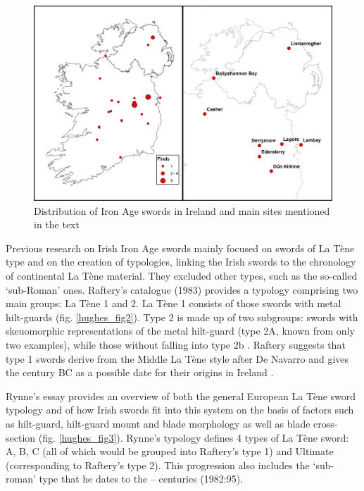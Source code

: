 \begin{figure}
\includegraphics[width=\linewidth]{figures/Hughes_Sword_fig01.jpg} 
\caption{Distribution of Iron Age swords in Ireland and main sites mentioned in the text}
\label{hughes_fig1}
\end{figure}
Previous research on Irish Iron Age swords \parencites{Rynne1982}{Raftery1983} mainly focused on swords of La Tène type and on the creation of typologies, linking the Irish swords to the chronology of continental La Tène material. 
They excluded other types, such as the so-called ‘sub-Roman’ ones. 
Raftery’s catalogue (1983) provides a typology comprising two main groups: 
La Tène 1 and 2. La Tène 1 consists of those swords with metal hilt-guards (fig. \ref{hughes_fig2}). 
Type 2 is made up of two subgroups: 
swords with skeuomorphic representations of the metal hilt-guard (type 2A, known from only two examples), while those without falling into type 2b 
\parencite[83--106]{Raftery1983}. 
Raftery suggests that type 1 swords derive from the Middle La Tène style after De Navarro and gives the  century BC as a possible date for their origins in Ireland 
\parencites{DeNavarro1972}[83]{Raftery1983}. 

Rynne’s \citeyear{Rynne1982} essay provides an overview of both the general European La Tène sword typology and of how Irish swords fit into this system on the basis of factors such as hilt-guard, hilt-guard mount and blade morphology as well as blade cross-section (fig. \ref{hughes_fig3}). 
Rynne’s typology defines 4 types of La Tène sword: A, B, C (all of which would be grouped into Raftery’s type 1) and Ultimate (corresponding to Raftery’s type 2). 
This progression also includes the ‘sub-roman’ type that he dates to the -- centuries (1982:95).

